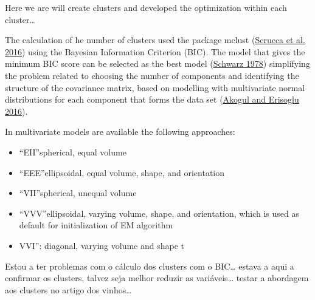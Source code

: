 \documentclass[
  12pt,
]{article}
\newenvironment{Shaded}{\begin{snugshade}}{\end{snugshade}}
\newcommand{\AttributeTok}[1]{\textcolor[rgb]{0.77,0.63,0.00}{#1}}
\newcommand{\ConstantTok}[1]{\textcolor[rgb]{0.00,0.00,0.00}{#1}}
\newcommand{\DecValTok}[1]{\textcolor[rgb]{0.00,0.00,0.81}{#1}}
\newcommand{\FloatTok}[1]{\textcolor[rgb]{0.00,0.00,0.81}{#1}}
\newcommand{\FunctionTok}[1]{\textcolor[rgb]{0.00,0.00,0.00}{#1}}
\newcommand{\NormalTok}[1]{#1}
\newcommand{\OtherTok}[1]{\textcolor[rgb]{0.56,0.35,0.01}{#1}}
\newcommand{\SpecialCharTok}[1]{\textcolor[rgb]{0.00,0.00,0.00}{#1}}
\newcommand{\StringTok}[1]{\textcolor[rgb]{0.31,0.60,0.02}{#1}}
\providecommand{\tightlist}{%
  \setlength{\itemsep}{0pt}\setlength{\parskip}{0pt}}
\begin{document}
Here we are will create clusters and developed the optimization within each
cluster\ldots{}

The calculation of he number of clusters used the package mclust (\protect\hyperlink{ref-scrucca2016}{Scrucca et al. 2016})
using the Bayesian Information Criterion (BIC). The model that gives the minimum
BIC score can be selected as the best model (\protect\hyperlink{ref-schwarz1978}{Schwarz 1978}) simplifying the
problem related to choosing the number of components and identifying the
structure of the covariance matrix, based on modelling with multivariate normal
distributions for each component that forms the data set (\protect\hyperlink{ref-akogul2016}{Akogul and Erisoglu 2016}).

In multivariate models are available the following approaches:

\begin{itemize}
\tightlist
\item
  ``EII''spherical, equal volume
\item
  ``EEE''ellipsoidal, equal volume, shape, and orientation
\item
  ``VII''spherical, unequal volume
\item
  ``VVV''ellipsoidal, varying volume, shape, and orientation, which is used as
  default for initialization of EM algorithm
\item
  VVI'': diagonal, varying volume and shape t
\end{itemize}

Estou a ter problemas com o cálculo dos clusters com o BIC\ldots{} estava a aqui a
confirmar os clusters, talvez seja melhor reduzir as variáveis\ldots{} testar a
abordagem aos clusters no artigo dos vinhos\ldots{}

\begin{Shaded}
\end{Shaded}
\end{document}
